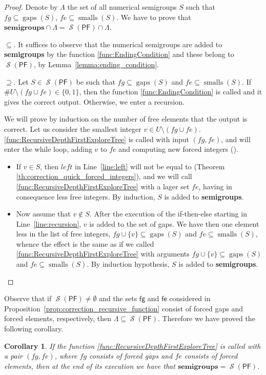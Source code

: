 \documentclass[11pt]{amsart}
\newtheorem{corollary}[theorem]{Corollary}
\theoremstyle{remark}
\begin{document}
\begin{proof}
Denote by $\Lambda$ the set of all numerical semigroups $S$ such that  $fg\subseteq \operatorname{gaps}(S)$, $fe\subseteq \operatorname{smalls}(S)$. We have to prove that $\mathbf{semigroups}\cap \Lambda = \operatorname{\mathcal{S}}({\ensuremath{\mathsf{PF}}})\cap \Lambda$.

\noindent $\subseteq$. It suffices to observe that the numerical semigroups are added to \textbf{semigroups} by the function \ref{func:EndingCondition} and these belong to $\operatorname{\mathcal{S}}({\ensuremath{\mathsf{PF}}})$, by Lemma~\ref{lemma:ending_condition}.

\noindent $\supseteq$. 
Let $S\in \operatorname{\mathcal{S}}({\ensuremath{\mathsf{PF}}})$ be such that $fg\subseteq \operatorname{gaps}(S)$ and $fe\subseteq \operatorname{smalls}(S)$. 
If $\# U\setminus(fg\cup fe)\in\{0,1\}$, then the function \ref{func:EndingCondition} is called and it gives the correct output. Otherwise, we enter a recursion.

We will prove by induction on the number of free elements that the output is correct.
Let us consider the smallest integer $v\in U\setminus(fg\cup fe)$. \ref{func:RecursiveDepthFirstExploreTree} is called with input $(fg,fe)$, and will enter the while loop, adding $v$ to $fe$ and computing new forced integers (\SimpleForcedIntegers). 
\begin{itemize}
\item If $v\in S$, then $left$ in Line~\ref{line:left} will not be equal to \fail (Theorem \ref{th:correction_quick_forced_integers}), and we will call \ref{func:RecursiveDepthFirstExploreTree} with a lager set $fe$, having in consequence less  free integers. By induction, $S$ is added to \textbf{semigroups}. 
\item Now assume that $v\not\in S$. After the execution of  the if-then-else starting in Line~\ref{line:recursion}, $v$ is added to the set of gaps. We have then one element less in the list of free integers, $fg\cup\{v\}\subseteq \operatorname{gaps}(S)$ and $fe\subseteq \operatorname{smalls}(S)$, whence the effect is the same as if we called \ref{func:RecursiveDepthFirstExploreTree}  with arguments $fg\cup\{v\}\subseteq \operatorname{gaps}(S)$ and $fe\subseteq \operatorname{smalls}(S)$. By induction hypothesis, $S$ is added to \textbf{semigroups}.\qedhere
\end{itemize}
\end{proof}
Observe that if $\operatorname{\mathcal{S}}({\ensuremath{\mathsf{PF}}})\ne\emptyset$ and the sets $\mathsf{fg}$ and $\mathsf{fe}$ considered in Proposition~\ref{prop:correction_recursive_function} consist of forced gaps and forced elements, respectively, then $\Lambda\subseteq\operatorname{\mathcal{S}}({\ensuremath{\mathsf{PF}}})$. Therefore we have proved the following corollary.
\begin{corollary}\label{cor:recursive_function}
If the function \ref{func:RecursiveDepthFirstExploreTree} is called with a pair $({fg,fe})$, where ${fg}$ consists of forced gaps and ${fe}$ consists of forced elements, then at the end of its execution we have that $\mathbf{semigroups}=\operatorname{\mathcal{S}}({\ensuremath{\mathsf{PF}}})$.
\end{corollary}
\end{document}
